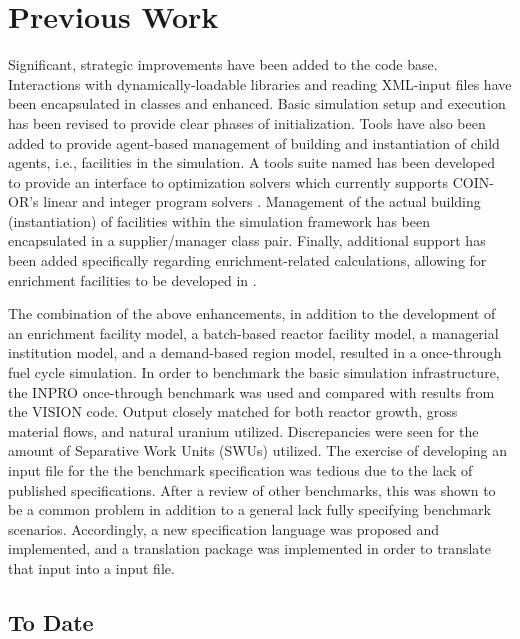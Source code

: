 \chapter{Previous Work}\label{ch:prevwork}

Significant, strategic improvements have been added to the \Cyclus code base.
Interactions with dynamically-loadable libraries and reading XML-input files
have been encapsulated in classes and enhanced. Basic simulation setup and
execution has been revised to provide clear phases of initialization. Tools have
also been added to provide agent-based management of building and instantiation
of child agents, i.e., facilities in the \Cyclus simulation. A tools suite named
\Cyclopts has been developed to provide an interface to optimization solvers
which currently supports COIN-OR's linear and integer program solvers
\cite{lougee_common_2003}. Management of the actual building (instantiation) of
facilities within the simulation framework has been encapsulated in a
supplier/manager class pair. Finally, additional support has been added
specifically regarding enrichment-related calculations, allowing for enrichment
facilities to be developed in \Cycamore.

The combination of the above enhancements, in addition to the development of an
enrichment facility model, a batch-based reactor facility model, a managerial
institution model, and a demand-based region model, resulted in a \Cyclus
once-through fuel cycle simulation. In order to benchmark the basic simulation
infrastructure, the INPRO \cite{_international_2009} once-through benchmark was
used and compared with results from the VISION \cite{yacout_vision_2006}
code. Output closely matched for both reactor growth, gross material flows, and
natural uranium utilized. Discrepancies were seen for the amount of Separative
Work Units (SWUs) utilized. The exercise of developing an input file for the the
benchmark specification was tedious due to the lack of published
specifications. After a review of other benchmarks, this was shown to be a
common problem in addition to a general lack fully specifying benchmark
scenarios. Accordingly, a new specification language was proposed and
implemented, and a translation package was implemented in order to translate
that input into a \Cyclus input file.

\section{\Cyclus To Date}

